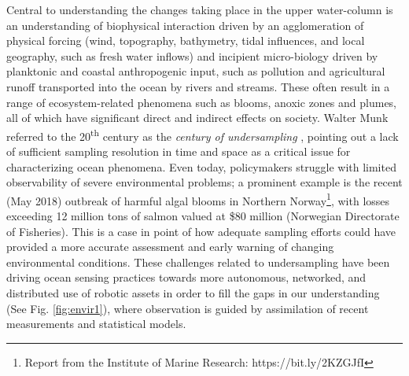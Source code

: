 \documentclass[aoas]{imsart}
\begin{document}
Central to understanding the changes taking place in the upper
water-column is an understanding of biophysical interaction driven by
an agglomeration of physical forcing (wind, topography, bathymetry,
tidal influences, and local geography, such as fresh water inflows) and
incipient micro-biology driven by planktonic and coastal anthropogenic
input, such as pollution and agricultural runoff transported into the ocean by rivers and streams. These often result
in a range of ecosystem-related phenomena such as blooms, anoxic zones
and plumes, all of which have significant direct and indirect effects
on society. Walter Munk referred to the 20\textsuperscript{th} century
as the \emph{century of undersampling} \citep{munk2002}, pointing out
a lack of sufficient sampling resolution in time and space as a
critical issue for characterizing ocean phenomena. Even today,
policymakers struggle with limited observability of severe
environmental problems; a prominent example is the recent (May 2018)
outbreak of harmful algal blooms in Northern Norway\footnote{Report
  from the Institute of Marine Research: https://bit.ly/2KZGJfI}, with
losses exceeding 12 million tons of salmon valued at \$80 million
(Norwegian Directorate of Fisheries). This is a case in point of how
adequate sampling efforts could have provided a more accurate
assessment and early warning of changing environmental
conditions. These challenges related to undersampling have been
driving ocean sensing practices towards more autonomous, networked,
and distributed use of robotic assets in order to fill the gaps in our
understanding (See Fig. \ref{fig:envir1}), where observation is guided
by assimilation of recent measurements and statistical models.
\end{document}
